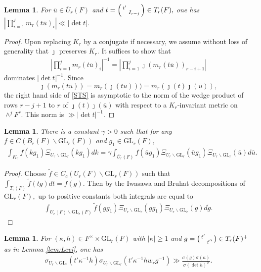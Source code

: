 \documentclass[12pt]{amsart}
\newtheorem{lem}[thm]{Lemma}
\theoremstyle{remark}
\numberwithin{equation}{section}
\newcommand{\GL}{\mathrm{GL}}
\theoremstyle{definition}
\newenvironment{psmatrix}
  {\left(\begin{smallmatrix}}
  {\end{smallmatrix}\right)}
\renewcommand{\bar}{\overline}
\numberwithin{equation}{subsection}
\begin{document}
\begin{lem} \label{lem:upper}
    For $\overline{u} \in \overline{U}_{r}(F)$ and $t=\begin{psmatrix}t' & \\ & I_{r-j} \end{psmatrix} \in T_r(F),$ one has $
        |\prod_{i=1}^jm_{r}(t\overline{u})_i| \ll |\det t|.$
\end{lem}
\begin{proof}
Upon replacing $K_r$ by a conjugate if necessary, we assume without loss of generality that $\jmath$ preserves $K_r.$ 
It suffices to show that 
\begin{align} \label{STS}
\left|\prod_{i=1}^jm_{r}(t\overline{u})_i\right|^{-1}=\left|\prod_{i=1}^{j}\jmath(m_{r}(t\overline{u}))_{r-i+1}\right|
\end{align}
dominates $|\det t|^{-1}.$  Since
$$
\jmath(m_{r}(t\overline{u}))=m_{r}(\jmath(t\overline{u})))=m_r(\jmath(t)\jmath(\overline{u})),
$$ the right hand side of \eqref{STS} is asymptotic to the norm of the wedge product of rows $r-j+1$ to $r$ of $\jmath(t)\jmath(\overline{u})$ with respect to a $K_r$-invariant metric on $\wedge^{j}F^r.$  This norm is $\gg|\det t|^{-1}.$
\end{proof}

\begin{lem}\label{lem:decompositioncompare}  There is a constant $\gamma>0$ such that for any
    $f\in C(B_r(F)\backslash\GL_r(F))$ and $g_1\in \GL_r(F),$  
    \begin{align*}
\int_{K_r}f(kg_1)\Xi_{U_{r} \backslash \GL_r}(kg_1)dk
        =\gamma\int_{\overline{U}_{r}(F)} f(\bar{u}g_1)\Xi_{U_{r} \backslash \GL_r}(\bar{u}g_1)\Xi_{U_{r} \backslash \GL_r}(\bar{u})d\bar{u}.
    \end{align*}
\end{lem}
\begin{proof}
Choose $\widetilde{f} \in C_c(U_r(F) \backslash \GL_r(F))$ such that $\int_{T_r(F)}\widetilde{f}(tg)dt=f(g).$  Then by the Iwasawa and Bruhat decompositions of $\GL_r(F),$ up to positive constants both integrals are equal to 
\begin{align*}
\int_{U_{r}(F)\backslash \GL_{r}(F)} \widetilde{f}(gg_1)\Xi_{U_{r} \backslash \GL_r}(gg_1)\Xi_{U_{r} \backslash \GL_r}(g) d\dot{g}.
\end{align*}
\end{proof}


\begin{lem} \label{lem:sig:bound:stuff}
For $(\kappa,h) \in F^\times \times \GL_r(F) $ with $|\kappa| \geq 1$ and $g=\begin{psmatrix} t' & \\ & t'' \end{psmatrix} \in T_{r}(F)^+$
 as in Lemma \ref{lem:Levi},
one has
\begin{align*}
    \sigma_{U_{r} \backslash \GL_{r}}(t'\kappa^{-1}h )\sigma_{U_{r} \backslash \GL_{r}}(t'\kappa^{-1} hw_rg^{-1}) \gg \frac{\sigma(g)\sigma(\kappa)}{\sigma(\det h)^{2}}.
\end{align*}
\end{lem}
\end{document}
